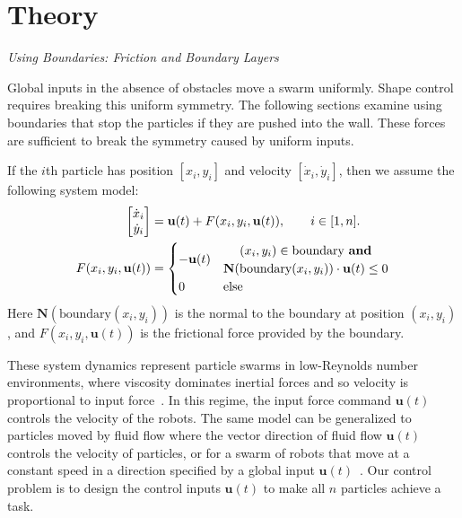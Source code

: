 \section{Theory}
\label{sec:theory}

\emph{Using Boundaries: Friction and Boundary Layers}\label{subsec:WallFriction}

Global inputs in the absence of obstacles move a swarm uniformly.  
Shape control requires breaking this uniform symmetry.
The following sections examine using boundaries that stop the particles if they are pushed into the wall.
 These forces are  sufficient to break the symmetry caused by uniform inputs.  
 
 If the $i$th particle has position $[x_i,y_i]$ and velocity $[\dot{x}_i, \dot{y}_i]$, then we assume the following system model:
 \begin{align*}\label{eq:swarmDynamicsAndFric} 
 \begin{bmatrix}
 \dot{x}_i\\
 \dot{y}_i
 \end{bmatrix}
 &=
 \mathbf{u}(t)
 +F(x_i,y_i, \mathbf{u}(t)), \qquad i \in [1,n].\\
 F(x_i,y_i, \mathbf{u}(t)) &= \begin{cases}
  - \mathbf{u}(t) & \begin{matrix}(x_i,y_i) \in  \textrm{boundary \textbf{and}}\\
\mathbf{N}(\textrm{boundary$(x_i,y_i)$})\cdot   \mathbf{u}(t) \le 0 \end{matrix}
 \\
 0 & \textrm{else} 
 \end{cases}
 \end{align*}
 Here $\mathbf{N}(\textrm{boundary$(x_i,y_i)$})$ is the normal to the boundary at position $(x_i,y_i)$, and
 $F(x_i,y_i, \mathbf{u}(t)) $ is the frictional force provided by the boundary.
 
 
These system dynamics represent particle swarms in low-Reynolds number environments, where viscosity dominates inertial forces and so velocity is proportional to input force~\cite{Purcell1977}. 
 In this regime, the input force command $\mathbf{u}(t)$ controls the velocity of the robots.  
  The same model can be generalized to particles moved by fluid flow where the vector direction of fluid flow $\mathbf{u}(t)$ controls the velocity of particles, or for a swarm of robots that move at a constant speed in a direction specified by a global input $\mathbf{u}(t)$~\cite{Rubenstein2012}.
 Our control problem is to design the control inputs $\mathbf{u}(t)$ to make all $n$ particles achieve a task.